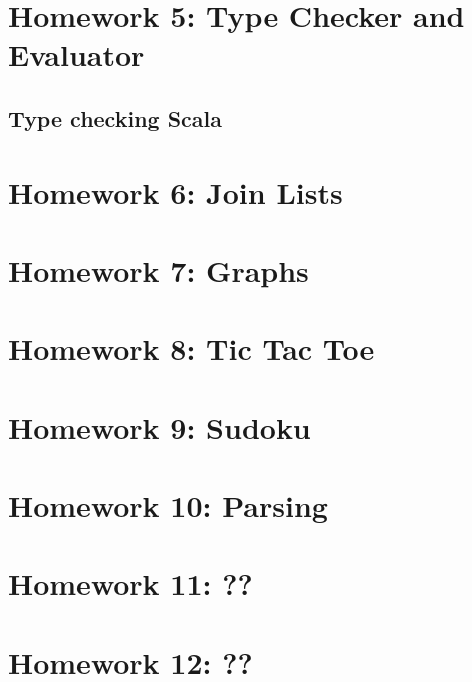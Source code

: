 \documentclass{book}
\begin{document}
\chapter{Homework 5: Type Checker and Evaluator}

\newlecture

\section{Type checking Scala}

\newlecture


\chapter{Homework 6: Join Lists}

\newlecture

\newlecture



\chapter{Homework  7: Graphs}

\newlecture

\newlecture


\newlecture

\chapter{Homework 8: Tic Tac Toe}

\newlecture


\newlecture

\newlecture


\chapter{Homework 9: Sudoku}

\newlecture

\newlecture


\chapter{Homework 10: Parsing}

\newlecture

\newlecture


\chapter{Homework 11: ??}

\newlecture

\newlecture

\chapter{Homework 12: ??}

\newlecture

\newlecture

\end{document}
